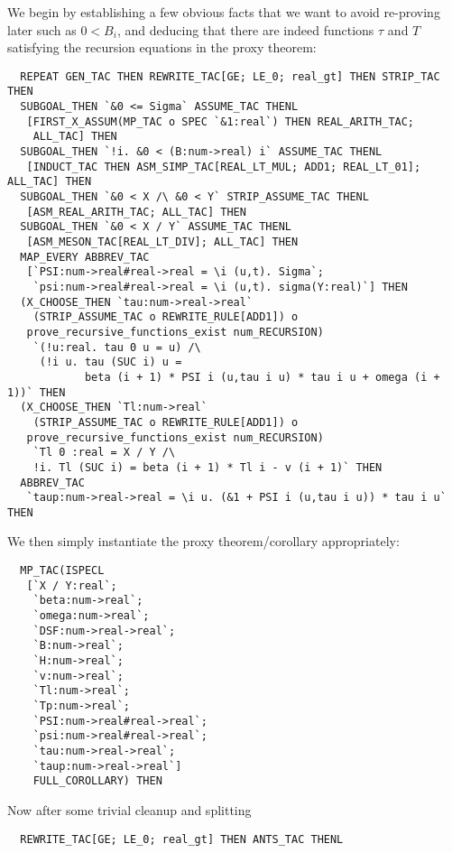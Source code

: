 \documentclass[10pt]{article}
\theoremstyle{definition}
\theoremstyle{remark}
\numberwithin{equation}{section}
\begin{document}
We begin by establishing a few obvious facts that we want to avoid re-proving
later such as $0 < B_i$, and deducing that there are indeed functions $\tau$
and $T$ satisfying the recursion equations in the proxy theorem:

\begin{scriptsize}\begin{verbatim}
  REPEAT GEN_TAC THEN REWRITE_TAC[GE; LE_0; real_gt] THEN STRIP_TAC THEN
  SUBGOAL_THEN `&0 <= Sigma` ASSUME_TAC THENL
   [FIRST_X_ASSUM(MP_TAC o SPEC `&1:real`) THEN REAL_ARITH_TAC;
    ALL_TAC] THEN
  SUBGOAL_THEN `!i. &0 < (B:num->real) i` ASSUME_TAC THENL
   [INDUCT_TAC THEN ASM_SIMP_TAC[REAL_LT_MUL; ADD1; REAL_LT_01]; ALL_TAC] THEN
  SUBGOAL_THEN `&0 < X /\ &0 < Y` STRIP_ASSUME_TAC THENL
   [ASM_REAL_ARITH_TAC; ALL_TAC] THEN
  SUBGOAL_THEN `&0 < X / Y` ASSUME_TAC THENL
   [ASM_MESON_TAC[REAL_LT_DIV]; ALL_TAC] THEN
  MAP_EVERY ABBREV_TAC
   [`PSI:num->real#real->real = \i (u,t). Sigma`;
    `psi:num->real#real->real = \i (u,t). sigma(Y:real)`] THEN
  (X_CHOOSE_THEN `tau:num->real->real`
    (STRIP_ASSUME_TAC o REWRITE_RULE[ADD1]) o
   prove_recursive_functions_exist num_RECURSION)
    `(!u:real. tau 0 u = u) /\
     (!i u. tau (SUC i) u =
            beta (i + 1) * PSI i (u,tau i u) * tau i u + omega (i + 1))` THEN
  (X_CHOOSE_THEN `Tl:num->real`
    (STRIP_ASSUME_TAC o REWRITE_RULE[ADD1]) o
   prove_recursive_functions_exist num_RECURSION)
    `Tl 0 :real = X / Y /\
    !i. Tl (SUC i) = beta (i + 1) * Tl i - v (i + 1)` THEN
  ABBREV_TAC
   `taup:num->real->real = \i u. (&1 + PSI i (u,tau i u)) * tau i u` THEN
\end{verbatim}\end{scriptsize}

We then simply instantiate the proxy theorem/corollary appropriately:

\begin{scriptsize}\begin{verbatim}
  MP_TAC(ISPECL
   [`X / Y:real`;
    `beta:num->real`;
    `omega:num->real`;
    `DSF:num->real->real`;
    `B:num->real`;
    `H:num->real`;
    `v:num->real`;
    `Tl:num->real`;
    `Tp:num->real`;
    `PSI:num->real#real->real`;
    `psi:num->real#real->real`;
    `tau:num->real->real`;
    `taup:num->real->real`]
    FULL_COROLLARY) THEN
\end{verbatim}\end{scriptsize}

Now after some trivial cleanup and splitting

\begin{scriptsize}\begin{verbatim}
  REWRITE_TAC[GE; LE_0; real_gt] THEN ANTS_TAC THENL
\end{verbatim}\end{scriptsize}
\end{document}
